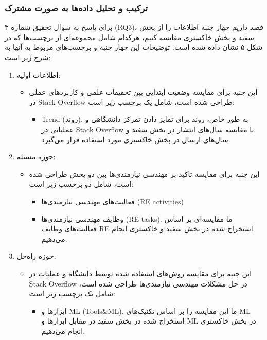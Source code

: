 \documentclass[a4paper,10pt]{article}
\begin{document}
            
            \subsubsection{ترکیب و تحلیل داده‌ها به صورت مشترک}

                برای پاسخ به سوال تحقیق شماره ۳ (RQ3)، قصد داریم چهار جنبه اطلاعات را از بخش سفید و بخش خاکستری مقایسه کنیم، هرکدام شامل مجموعه‌ای از برچسب‌ها که در شکل ۵ نشان داده شده است. توضیحات این چهار جنبه و برچسب‌های مربوط به آنها به شرح زیر است:

                \begin{enumerate}
                    \item اطلاعات اولیه:
                    \begin{itemize}
                        \item این جنبه برای مقایسه وضعیت ابتدایی بین تحقیقات علمی و کاربردهای عملی در Stack Overflow طراحی شده است، شامل یک برچسب زیر است:
                        \begin{itemize}
                            \item Trend (روند). به طور خاص، روند برای تمایز دادن تمرکز دانشگاهی و عملیاتی در Stack Overflow با مقایسه سال‌های انتشار در بخش سفید و سال‌های ارسال در بخش خاکستری مورد استفاده قرار می‌گیرد.
                        \end{itemize}
                    \end{itemize}
                    
                    \item حوزه مسئله:
                    \begin{itemize}
                        \item این جنبه برای مقایسه تاکید بر مهندسی نیازمندی‌ها بین دو بخش طراحی شده است، شامل دو برچسب زیر است:
                        \begin{itemize}
                            \item فعالیت‌های مهندسی نیازمندی‌ها (RE activities)
                            \item وظایف مهندسی نیازمندی‌ها (RE tasks). ما مقایسه‌ای بر اساس فعالیت‌های وظایف RE استخراج شده در بخش سفید و خاکستری انجام می‌دهیم.
                        \end{itemize}
                    \end{itemize}
                    
                    \item حوزه راه‌حل:
                    \begin{itemize}
                        \item این جنبه برای مقایسه روش‌های استفاده شده توسط دانشگاه و عملیات در Stack Overflow در حل مشکلات مهندسی نیازمندی‌ها طراحی شده است، شامل یک برچسب زیر است:
                        \begin{itemize}
                            \item ابزارها و ML (Tools\&ML). ما این مقایسه را بر اساس تکنیک‌های ML استخراج شده در بخش سفید در مقابل ابزارها و ML در بخش خاکستری انجام می‌دهیم.
                        \end{itemize}
                    \end{itemize}
                    

\end{enumerate}
\end{document}
